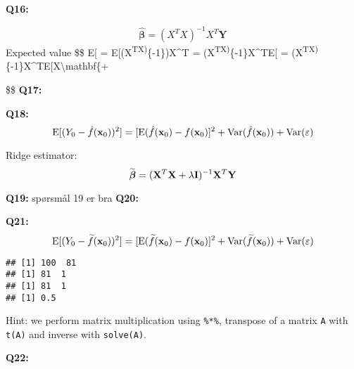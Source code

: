 \documentclass[]{article}
\newenvironment{Shaded}{\begin{snugshade}}{\end{snugshade}}
\newcommand{\KeywordTok}[1]{\textcolor[rgb]{0.13,0.29,0.53}{\textbf{#1}}}
\newcommand{\StringTok}[1]{\textcolor[rgb]{0.31,0.60,0.02}{#1}}
\newcommand{\OperatorTok}[1]{\textcolor[rgb]{0.81,0.36,0.00}{\textbf{#1}}}
\newcommand{\NormalTok}[1]{#1}
\begin{document}
\textbf{Q16:}

\[
\hat{\boldsymbol{\beta}} = (X^TX)^{-1}X^T\mathbf{Y}
\] Expected value \$\$ E{[}\boldsymbol{\hat{\beta}}{]} =
E{[}(X\textsuperscript{TX)}\{-1\})X\^{}T\mathbf{Y}{]} =
(X\textsuperscript{TX)}\{-1\}X\^{}TE{[}\mathbf{Y}{]} =
(X\textsuperscript{TX)}\{-1\}X\^{}TE{[}X\textbackslash{}mathbf\{\beta +
\boldsymbol{\epsilon}{]}

\$\$ \textbf{Q17:}

\textbf{Q18:}
\[\text{E}[(Y_0-\hat{f}({\bf x}_0))^2]=[\text{E}(\hat{f}({\bf x}_0)-f({\bf x}_0)]^2+\text{Var}(\hat{f}({\bf x}_0) ) + \text{Var}(\varepsilon)\]

Ridge estimator: \[
\widetilde{\boldsymbol \beta}=({\bf X}^T{\bf X}+\lambda {\bf I})^{-1}{\bf X}^T{\bf Y}
\]

\textbf{Q19:} spørsmål 19 er bra \textbf{Q20:}

\textbf{Q21:}
\[\text{E}[(Y_0-\widetilde{f}({\bf x}_0))^2]=[\text{E}(\widetilde{f}({\bf x}_0)-f({\bf x}_0)]^2+\text{Var}(\widetilde{f}({\bf x}_0) ) + \text{Var}(\varepsilon)\]

\begin{Shaded}
\end{Shaded}

\begin{verbatim}
## [1] 100  81
## [1] 81  1
## [1] 81  1
## [1] 0.5
\end{verbatim}

Hint: we perform matrix multiplication using \texttt{\%*\%}, transpose
of a matrix \texttt{A} with \texttt{t(A)} and inverse with
\texttt{solve(A)}.

\textbf{Q22:}
\end{document}
